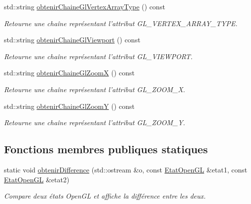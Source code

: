 \begin{DoxyCompactItemize}
std\-::string \hyperlink{group__utilitaire_ga27df79ce6a4279f818c5cd041e8dc6bd}{obtenir\-Chaine\-Gl\-Vertex\-Array\-Type} () const 
\begin{DoxyCompactList}\small\item\em Retourne une chaîne représentant l'attribut G\-L\-\_\-\-V\-E\-R\-T\-E\-X\-\_\-\-A\-R\-R\-A\-Y\-\_\-\-T\-Y\-P\-E. \end{DoxyCompactList}\item 
std\-::string \hyperlink{group__utilitaire_ga6afc9840c8a03deb6d741843bf82d28d}{obtenir\-Chaine\-Gl\-Viewport} () const 
\begin{DoxyCompactList}\small\item\em Retourne une chaîne représentant l'attribut G\-L\-\_\-\-V\-I\-E\-W\-P\-O\-R\-T. \end{DoxyCompactList}\item 
std\-::string \hyperlink{group__utilitaire_ga8ca35baf35a77d201c5a770a22aedbe8}{obtenir\-Chaine\-Gl\-Zoom\-X} () const 
\begin{DoxyCompactList}\small\item\em Retourne une chaîne représentant l'attribut G\-L\-\_\-\-Z\-O\-O\-M\-\_\-\-X. \end{DoxyCompactList}\item 
std\-::string \hyperlink{group__utilitaire_ga4231723bc8a26f191c53329dceed9222}{obtenir\-Chaine\-Gl\-Zoom\-Y} () const 
\begin{DoxyCompactList}\small\item\em Retourne une chaîne représentant l'attribut G\-L\-\_\-\-Z\-O\-O\-M\-\_\-\-Y. \end{DoxyCompactList}\end{DoxyCompactItemize}
\subsection*{Fonctions membres publiques statiques}
\begin{DoxyCompactItemize}
\item 
static void \hyperlink{group__utilitaire_ga24ddfdab3e65cc4069b86ba84d3f565b}{obtenir\-Difference} (std\-::ostream \&o, const \hyperlink{class_etat_open_g_l}{Etat\-Open\-G\-L} \&etat1, const \hyperlink{class_etat_open_g_l}{Etat\-Open\-G\-L} \&etat2)
\begin{DoxyCompactList}\small\item\em Compare deux états Open\-G\-L et affiche la différence entre les deux. \end{DoxyCompactList}\end{DoxyCompactItemize}


